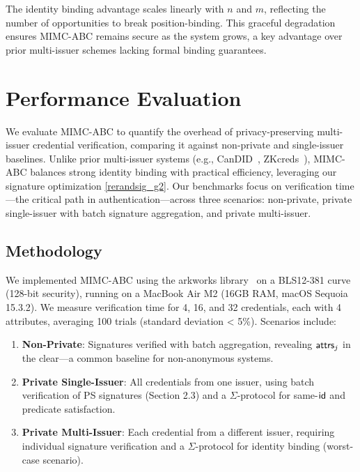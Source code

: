 The identity binding advantage scales linearly with $n$ and $m$, reflecting the number of opportunities to break position-binding. This graceful degradation ensures MIMC-ABC remains secure as the system grows, a key advantage over prior multi-issuer schemes lacking formal binding guarantees.



\section{Performance Evaluation}

We evaluate MIMC-ABC to quantify the overhead of privacy-preserving multi-issuer credential verification, comparing it against non-private and single-issuer baselines. Unlike prior multi-issuer systems (e.g., CanDID~\cite{maram_candid_2020}, ZKcreds~\cite{rosenberg_zk-creds_2022}), MIMC-ABC balances strong identity binding with practical efficiency, leveraging our signature optimization \ref{rerandsig_g2}. Our benchmarks focus on verification time—the critical path in authentication—across three scenarios: non-private, private single-issuer with batch signature aggregation, and private multi-issuer.

\subsection{Methodology}

We implemented MIMC-ABC using the arkworks library~\cite{arkworks_contributors_arkworks_2022} on a BLS12-381 curve (128-bit security), running on a MacBook Air M2 (16GB RAM, macOS Sequoia 15.3.2). We measure verification time for 4, 16, and 32 credentials, each with 4 attributes, averaging 100 trials (standard deviation < 5\%). Scenarios include:
\begin{enumerate}
    \item \textbf{Non-Private}: Signatures verified with batch aggregation, revealing $\mathsf{attrs}_j$ in the clear—a common baseline for non-anonymous systems.
    \item \textbf{Private Single-Issuer}: All credentials from one issuer, using batch verification of PS signatures (Section 2.3) and a $\Sigma$-protocol for same-$\mathsf{id}$ and predicate satisfaction.
    \item \textbf{Private Multi-Issuer}: Each credential from a different issuer, requiring individual signature verification and a $\Sigma$-protocol for identity binding (worst-case scenario).
\end{enumerate}





